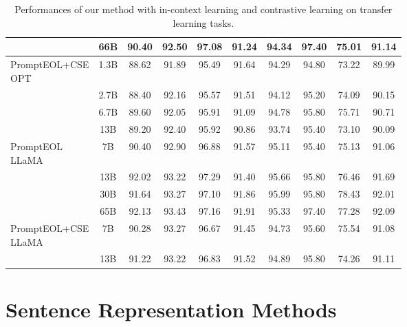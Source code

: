 \documentclass{article}
\begin{document}
\begin{table*}[h]
{\begin{tabular}{lccccccccc}
 &  66B  & 90.40 & 92.50 & 97.08 & 91.24 & 94.34 & 97.40 & 75.01 & 91.14\\
\midrule
\multirowcell{4}[0pt][l]{PromptEOL+CSE\\OPT}
 &  1.3B& 88.62 & 91.89 & 95.49 & 91.64 & 94.29 & 94.80 & 73.22 & 89.99 \\
 &  2.7B& 88.40 & 92.16 & 95.57 & 91.51 & 94.12 & 95.20 & 74.09 & 90.15 \\
 &  6.7B& 89.60 & 92.05 & 95.91 & 91.09 & 94.78 & 95.80 & 75.71 & 90.71 \\
 &  13B & 89.20 & 92.40 & 95.92 & 90.86 & 93.74 & 95.40 & 73.10 & 90.09 \\
\midrule
\multirowcell{4}[0pt][l]{PromptEOL\\LLaMA}
& 7B & 90.40 & 92.90 & 96.88 & 91.57 & 95.11 & 95.40 & 75.13 & 91.06 \\
& 13B & 92.02 & 93.22 & 97.29 & 91.40 & 95.66 & 95.80 & 76.46 & 91.69 \\
& 30B & 91.64 & 93.27 & 97.10 & 91.86 & 95.99 & 95.80 & 78.43 & 92.01 \\
& 65B & 92.13 & 93.43 & 97.16 & 91.91 & 95.33 & 97.40 & 77.28 & 92.09 \\
\midrule
\multirowcell{2}[0pt][l]{PromptEOL+CSE\\LLaMA}
& 7B & 90.28 & 93.27 & 96.67 & 91.45 & 94.73 & 95.60 & 75.54 & 91.08 \\
& 13B& 91.22 & 93.22 & 96.83 & 91.52 & 94.89 & 95.80 & 74.26 & 91.11 \\
\bottomrule
\end{tabular}}
\caption{ Performances of our method with in-context learning and contrastive learning on transfer learning tasks.
} \label{fig:transfer_icl_cse}
\end{table*}


\section{Sentence Representation Methods}\label{apx:sentence_rep}
\end{document}
